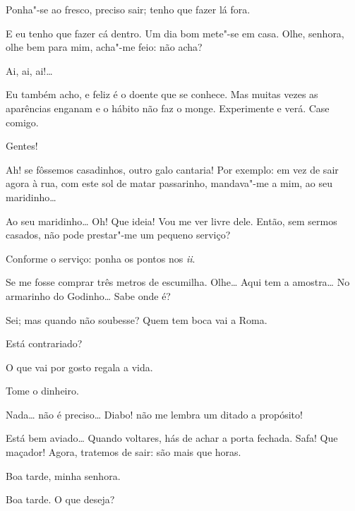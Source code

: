   Ponha"-se ao fresco, preciso sair; tenho que fazer lá fora.

  E eu tenho que fazer cá dentro. Um dia bom mete"-se em casa.
 Olhe, senhora, olhe bem para mim, acha"-me feio: não acha?

  Ai, ai, ai!\ldots{}

  Eu também acho, e feliz é o doente que se conhece. Mas muitas
vezes as aparências enganam e o hábito não faz o monge. Experimente e verá.
 Case comigo.

  Gentes!

  Ah! se fôssemos casadinhos, outro galo cantaria! Por exemplo: em
vez de sair agora à rua, com este sol de matar passarinho, mandava"-me a mim, ao
seu maridinho\ldots{}

  Ao seu maridinho\ldots{} 
Oh! Que ideia! Vou me ver livre dele.  Então, sem sermos casados,
não pode prestar"-me um pequeno serviço?

  Conforme o serviço: ponha os pontos nos \textit{ii}.

  Se me fosse comprar três metros de escumilha. Olhe\ldots{} Aqui tem
a amostra\ldots{} No armarinho do Godinho\ldots{} Sabe onde é?

  Sei; mas quando não soubesse? Quem tem boca vai a Roma.

  Está contrariado?

  O que vai por gosto regala a vida.

  Tome o dinheiro.

  Nada\ldots{} não é preciso\ldots{} 
Diabo! não me lembra um ditado a propósito! 


\stagedir{\textsc{[Inês]}}

  Está bem aviado\ldots{} Quando voltares, hás de achar a porta
fechada. 
Safa! Que maçador! Agora, tratemos de sair: são mais que horas. 



  Boa tarde, minha senhora.

  Boa tarde. O que deseja?

